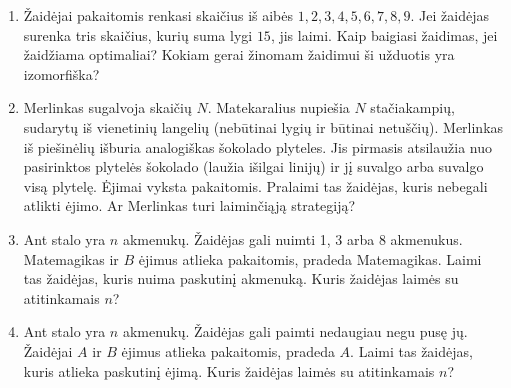 \begin{enumerate}
  \item Žaidėjai pakaitomis renkasi skaičius iš aibės ${1, 2, 3, 4, 5, 6, 7,
    8, 9}$. Jei žaidėjas surenka tris skaičius, kurių suma lygi $15$, jis
    laimi.  Kaip baigiasi žaidimas, jei žaidžiama optimaliai? Kokiam gerai
    žinomam žaidimui ši užduotis yra izomorfiška?

  \item Merlinkas sugalvoja skaičių $N$. Matekaralius nupiešia $N$
    stačiakampių, sudarytų iš vienetinių langelių (nebūtinai lygių ir būtinai
    netuščių). Merlinkas iš piešinėlių išburia analogiškas šokolado plyteles.
    Jis pirmasis atsilaužia nuo pasirinktos plytelės šokolado (laužia išilgai
    linijų) ir jį suvalgo arba suvalgo visą plytelę. Ėjimai vyksta
    pakaitomis. Pralaimi tas žaidėjas, kuris nebegali atlikti ėjimo.  Ar
    Merlinkas turi laiminčiąją strategiją?  

  \item Ant stalo yra $n$ akmenukų. Žaidėjas gali nuimti 1, 3 arba 8
    akmenukus. Matemagikas ir $B$ ėjimus atlieka pakaitomis, pradeda
    Matemagikas.  Laimi tas žaidėjas, kuris nuima paskutinį akmenuką. Kuris
    žaidėjas laimės su atitinkamais $n$?

  \item Ant stalo yra $n$ akmenukų. Žaidėjas gali paimti nedaugiau negu pusę
    jų. Žaidėjai $A$ ir $B$ ėjimus atlieka pakaitomis, pradeda $A$.  Laimi
    tas žaidėjas, kuris atlieka paskutinį ėjimą. Kuris žaidėjas laimės su
    atitinkamais $n$?


\end{enumerate}
